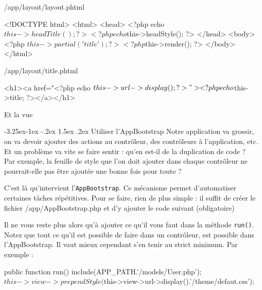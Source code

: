 \documentclass[a4paper,11pt]{article}
\makeatletter
\renewcommand{\subsection}{\@startsection{subsection}{2}{\z@}%
             {-3.25ex\@plus -1ex \@minus -.2ex}%
             {1.5ex \@plus .2ex}%
             {\color{bleuFonce}\normalfont\large\bfseries}}
\makeatother
\begin{document}
/app/layout/layout.phtml
\begin{HTML}
<!DOCTYPE html>
<html>
  <head>
    <?php echo $this->headTitle(); ?>
    <?php echo $this->headStyle(); ?>
  </head>
  <body>
    <?php $this->partial('title'); ?>

    <?php $this->render(); ?>
  </body>
</html>
\end{HTML}

/app/layout/title.phtml
\begin{HTML}
<h1><a href="<?php echo $this->url->display();?>"><?php echo $this->title; ?></a></h1>
\end{HTML}

Et la vue

\subsection{Utiliser l'AppBootstrap}
Notre application va grossir, on va devoir ajouter des actions au contrôleur, des contrôleurs à l'application, etc. Et un problème va vite se faire sentir : qu'en est-il de la duplication de code ? Par exemple, la feuille de style que l'on doit ajouter dans chaque contrôleur ne pourrait-elle pas être ajoutée une bonne fois pour toute ?

C'est là qu'intervient l'\texttt{AppBootstrap}. Ce mécanisme permet d'automatiser certaines tâches répétitives. Pour se faire, rien de plus simple : il suffit de créer le fichier /app/AppBootstrap.php et d'y ajouter le code suivant (obligatoire)

Il ne vous reste plus alors qu'à ajouter ce qu'il vous faut dans la méthode \texttt{run()}. Notez que tout ce qu'il est possible de faire dans un contrôleur, est possible dans l'AppBootstrap. Il vaut mieux cependant s'en tenir au strict minimum. Par exemple :
\begin{PHP}
public function run() {
  include(APP_PATH.'/models/User.php');
  $this->view->prependStyle($this->view->url->display().'/theme/defaut.css');
}
\end{PHP}
\end{document}
